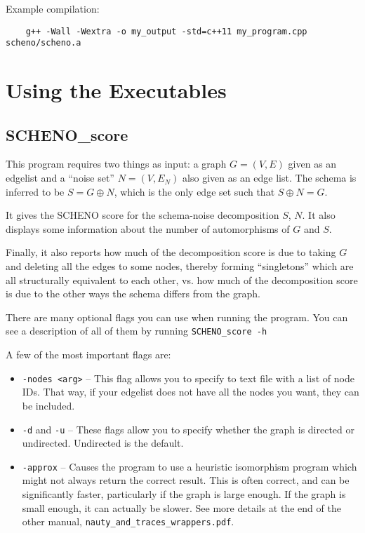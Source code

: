 \documentclass{article}
\begin{document}
Example compilation:

\begin{verbatim}
    g++ -Wall -Wextra -o my_output -std=c++11 my_program.cpp scheno/scheno.a
\end{verbatim}

\newpage

\section{Using the Executables}\label{sec:binaries}

\subsection{SCHENO\_score}

This program requires two things as input: a graph $G = (V, E)$ given as an edgelist and a ``noise set'' $N = (V, E_N)$ also given as an edge list. The schema is inferred to be $S = G \oplus N$, which is the only edge set such that $S \oplus N = G$.

It gives the SCHENO score for the schema-noise decomposition $S$, $N$. It also displays some information about the number of automorphisms of $G$ and $S$. 

Finally, it also reports how much of the decomposition score is due to taking $G$ and deleting all the edges to some nodes, thereby forming ``singletons'' which are all structurally equivalent to each other, vs. how much of the decomposition score is due to the other ways the schema differs from the graph.

There are many optional flags you can use when running the program. You can see a description of all of them by running \verb|SCHENO_score -h|

A few of the most important flags are:

\begin{itemize}
    \item \verb|-nodes <arg>| -- This flag allows you to specify to text file with a list of node IDs. That way, if your edgelist does not have all the nodes you want, they can be included.
    \item \verb|-d| and \verb|-u| -- These flags allow you to specify whether the graph is directed or undirected. Undirected is the default.
    \item \verb|-approx| -- Causes the program to use a heuristic isomorphism program which might not always return the correct result. This is often correct, and can be significantly faster, particularly if the graph is large enough. If the graph is small enough, it can actually be slower. See more details at the end of the other manual, \verb|nauty_and_traces_wrappers.pdf|.
\end{itemize}
\end{document}
